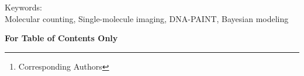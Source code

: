\documentclass[twocolumn]{article}
\begin{document}
\title{}

\author{
  Alexander Hillsley$^{1}$\thanks{Corresponding Authors},
  Johannes Stein$^{2,3}$,
  Paul W. Tillberg$^{1}$,
  David L. Stern$^{1}$,
  Jan Funke$^{1}$\footnotemark[1]
  \\\\
  \normalsize{$^1$ HHMI Janelia Research Campus, Ashburn, VA, 20147, United States}, \\
  \normalsize{$^2$ Wyss Institute of Biologically Inspired Engineering, Boston, MA, 02215, United States } \\
  \normalsize{$^3$ Department of Genetics, Harvard Medical School, Boston, MA, 02215, United States} \\
  \normalsize{$*$ Email: avhillsley1@gmail.com, funkej@janelia.hhmi.org}
  }

\maketitle




Keywords: \\
Molecular counting, Single-molecule imaging, DNA-PAINT, Bayesian modeling











{
  \small
  
  
}

\clearpage
\textbf{For Table of Contents Only} \\ 

% 
\end{document}
